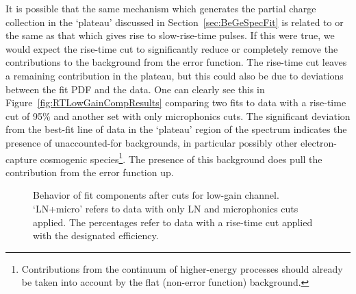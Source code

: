 It is possible that the same mechanism which generates the partial charge collection in the `plateau' discussed in Section~\ref{sec:BeGeSpecFit} is related to or the same as that which gives rise to slow-rise-time pulses.  If this were true, we would expect the rise-time cut to significantly reduce or completely remove the contributions to the background from the error function.  The rise-time cut leaves a remaining contribution in the plateau, but this could also be due to deviations between the fit PDF and the data.  One can clearly see this in Figure~\ref{fig:RTLowGainCompResults} comparing two fits to data with a rise-time cut of 95\% and another set with only microphonics cuts.  The significant deviation from the best-fit line of data in the `plateau' region of the spectrum indicates the presence of unaccounted-for backgrounds, in particular possibly other electron-capture cosmogenic species\footnote{Contributions from the continuum of higher-energy processes should already be taken into account by the flat (non-error function) background.}.  The presence of this background does pull the contribution from the error function up.  

						\begin{sidewaysfigure}
							\centering
							\caption[Behavior of fit components after cuts for low-gain channel]
							{Behavior of fit components after cuts for low-gain channel.  `LN+micro' refers to data with only
							LN and microphonics cuts applied.  The percentages
							refer to data with a rise-time cut applied with the designated efficiency.}
							\label{fig:RTSimLowGainResults}
						\end{sidewaysfigure}

